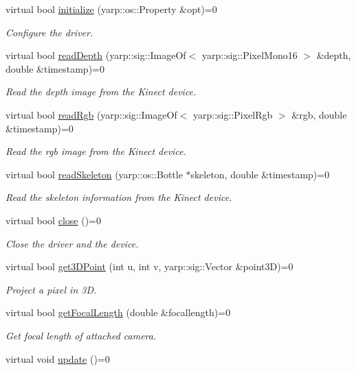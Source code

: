 \begin{DoxyCompactItemize}
\item 
virtual bool \hyperlink{classkinectWrapper_1_1KinectDriver_a4ac34031bd32525a6e3df7e2aa3389e4}{initialize} (yarp\+::os\+::\+Property \&opt)=0
\begin{DoxyCompactList}\small\item\em Configure the driver. \end{DoxyCompactList}\item 
virtual bool \hyperlink{classkinectWrapper_1_1KinectDriver_ac8ecdcb66bce7478113be5bbfdcdc540}{read\+Depth} (yarp\+::sig\+::\+Image\+Of$<$ yarp\+::sig\+::\+Pixel\+Mono16 $>$ \&depth, double \&timestamp)=0
\begin{DoxyCompactList}\small\item\em Read the depth image from the Kinect device. \end{DoxyCompactList}\item 
virtual bool \hyperlink{classkinectWrapper_1_1KinectDriver_a75851d95e5095f28ab1d2f84bb83e8c8}{read\+Rgb} (yarp\+::sig\+::\+Image\+Of$<$ yarp\+::sig\+::\+Pixel\+Rgb $>$ \&rgb, double \&timestamp)=0
\begin{DoxyCompactList}\small\item\em Read the rgb image from the Kinect device. \end{DoxyCompactList}\item 
virtual bool \hyperlink{classkinectWrapper_1_1KinectDriver_a4438aefe634466a180b7e7ffafa4267a}{read\+Skeleton} (yarp\+::os\+::\+Bottle $\ast$skeleton, double \&timestamp)=0
\begin{DoxyCompactList}\small\item\em Read the skeleton information from the Kinect device. \end{DoxyCompactList}\item 
virtual bool \hyperlink{classkinectWrapper_1_1KinectDriver_a1735a23505e5dfbf84ec77fda9c082ba}{close} ()=0
\begin{DoxyCompactList}\small\item\em Close the driver and the device. \end{DoxyCompactList}\item 
virtual bool \hyperlink{classkinectWrapper_1_1KinectDriver_abaf6f40b416f3fc27dec1ea284d3ee5a}{get3\+D\+Point} (int u, int v, yarp\+::sig\+::\+Vector \&point3D)=0
\begin{DoxyCompactList}\small\item\em Project a pixel in 3D. \end{DoxyCompactList}\item 
virtual bool \hyperlink{classkinectWrapper_1_1KinectDriver_a6091c144c7d80622d9f16df4267e6370}{get\+Focal\+Length} (double \&focallength)=0
\begin{DoxyCompactList}\small\item\em Get focal length of attached camera. \end{DoxyCompactList}\item 
virtual void \hyperlink{classkinectWrapper_1_1KinectDriver_acf56a6ba90b6e827390228d313ae1f7a}{update} ()=0\label{classkinectWrapper_1_1KinectDriver_acf56a6ba90b6e827390228d313ae1f7a}


\end{DoxyCompactItemize}
